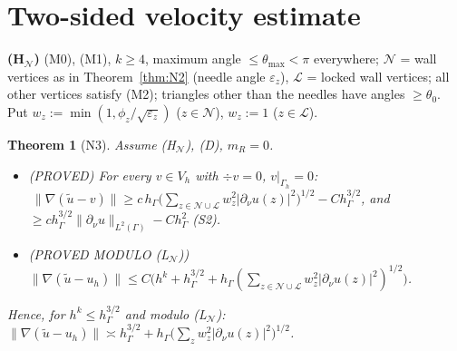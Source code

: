 \documentclass[11pt]{article}
\newtheorem{theorem}{Theorem}
\theoremstyle{remark}
\newcommand{\hG}{h_\Gamma}
\newcommand{\dn}{\partial_\nu}
\newcommand{\norm}[1]{\|#1\|}
\newcommand{\Nset}{\mathcal N}
\newcommand{\Lk}{\mathcal L}
\begin{document}
\section{Two-sided velocity estimate}\label{sec:N3}
\textbf{(H$_\Nset$)} (M0), (M1), $k\ge4$, maximum angle $\le\theta_{\max}<\pi$ everywhere; $\Nset$ = wall vertices as in
Theorem~\ref{thm:N2} (needle angle $\varepsilon_z$), $\Lk$ = locked wall vertices; all other vertices satisfy (M2); triangles other than the
needles have angles $\ge\theta_0$. Put $w_z:=\min(1,\phi_z/\sqrt{\varepsilon_z})$ ($z\in\Nset$), $w_z:=1$ ($z\in\Lk$).
\begin{theorem}[N3]\label{thm:N3}
Assume (H$_\Nset$), (D), $m_R=0$.
\begin{itemize}
\item[(i)] (PROVED) For every $v\in V_h$ with $\div v=0$, $v|_{\Gamma_h}=0$:
$\ \norm{\nabla(\tilde u-v)}\ge c\,\hG\big(\sum_{z\in\Nset\cup\Lk}w_z^2|\dn u(z)|^2\big)^{1/2}-C\hG^{3/2}$, and $\ge c\hG^{3/2}\norm{\dn u}_{L^2(\Gamma)}-C\hG^2$ (S2).
\item[(ii)] (PROVED MODULO (L$_\Nset$)) $\norm{\nabla(\tilde u-u_h)}\le C\big(h^k+\hG^{3/2}+\hG(\sum_{z\in\Nset\cup\Lk}w_z^2|\dn u(z)|^2)^{1/2}\big)$.
\end{itemize}
Hence, for $h^k\le\hG^{3/2}$ and modulo (L$_\Nset$): $\norm{\nabla(\tilde u-u_h)}\asymp\hG^{3/2}+\hG\big(\sum_zw_z^2|\dn u(z)|^2\big)^{1/2}$.
\end{theorem}
\end{document}
